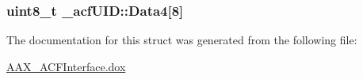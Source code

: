 \subsubsection[{Data4}]{\setlength{\rightskip}{0pt plus 5cm}uint8\+\_\+t \+\_\+acf\+U\+I\+D\+::\+Data4\mbox{[}8\mbox{]}}\label{a00008_aefd8884cd99d91f3213573876983b0ed}


The documentation for this struct was generated from the following file\+:\begin{DoxyCompactItemize}
\item 
\hyperlink{a00150}{A\+A\+X\+\_\+\+A\+C\+F\+Interface.\+dox}\end{DoxyCompactItemize}
